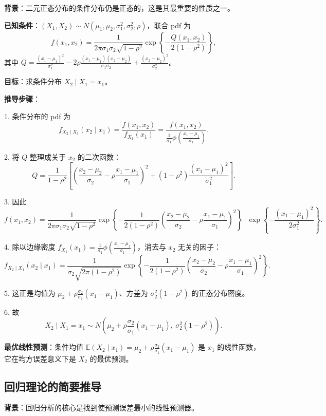 \textbf{背景}：二元正态分布的条件分布仍是正态的，这是其最重要的性质之一。

\textbf{已知条件}：$(X_1, X_2) \sim N(\mu_1, \mu_2, \sigma_1^2, \sigma_2^2, \rho)$，联合 pdf 为
\[
f(x_1, x_2) = \frac{1}{2\pi\sigma_1\sigma_2\sqrt{1-\rho^2}} \exp\left\{ -\frac{Q(x_1,x_2)}{2(1-\rho^2)} \right\},
\]
其中 $Q = \frac{(x_1-\mu_1)^2}{\sigma_1^2} - 2\rho\frac{(x_1-\mu_1)(x_2-\mu_2)}{\sigma_1\sigma_2} + \frac{(x_2-\mu_2)^2}{\sigma_2^2}$。

\textbf{目标}：求条件分布 $X_2 \mid X_1 = x_1$。

\textbf{推导步骤}：

1. 条件分布的 pdf 为
\[
f_{X_2 \mid X_1}(x_2 \mid x_1) = \frac{f(x_1, x_2)}{f_{X_1}(x_1)} = \frac{f(x_1, x_2)}{\frac{1}{\sigma_1}\phi\!\left(\frac{x_1-\mu_1}{\sigma_1}\right)}.
\]

2. 将 $Q$ 整理成关于 $x_2$ 的二次函数：
\[
Q = \frac{1}{1-\rho^2}\left[ \left(\frac{x_2-\mu_2}{\sigma_2} - \rho\frac{x_1-\mu_1}{\sigma_1}\right)^2 + (1-\rho^2)\frac{(x_1-\mu_1)^2}{\sigma_1^2} \right].
\]

3. 因此
\[
f(x_1, x_2) = \frac{1}{2\pi\sigma_1\sigma_2\sqrt{1-\rho^2}} \exp\left\{ -\frac{1}{2(1-\rho^2)}\left(\frac{x_2-\mu_2}{\sigma_2} - \rho\frac{x_1-\mu_1}{\sigma_1}\right)^2 \right\} \cdot \exp\left\{ -\frac{(x_1-\mu_1)^2}{2\sigma_1^2} \right\}.
\]

4. 除以边缘密度 $f_{X_1}(x_1) = \frac{1}{\sigma_1}\phi\!\left(\frac{x_1-\mu_1}{\sigma_1}\right)$，消去与 $x_2$ 无关的因子：
\[
f_{X_2 \mid X_1}(x_2 \mid x_1) = \frac{1}{\sigma_2\sqrt{2\pi(1-\rho^2)}} \exp\left\{ -\frac{1}{2(1-\rho^2)}\left(\frac{x_2-\mu_2}{\sigma_2} - \rho\frac{x_1-\mu_1}{\sigma_1}\right)^2 \right\}.
\]

5. 这正是均值为 $\mu_2 + \rho\frac{\sigma_2}{\sigma_1}(x_1 - \mu_1)$、方差为 $\sigma_2^2(1-\rho^2)$ 的正态分布密度。

6. 故
\[
X_2 \mid X_1 = x_1 \sim N\!\left(\mu_2 + \rho\frac{\sigma_2}{\sigma_1}(x_1 - \mu_1),\ \sigma_2^2(1-\rho^2)\right).
\]

\textbf{最优线性预测}：条件均值 $\mathbb{E}(X_2 \mid x_1) = \mu_2 + \rho\frac{\sigma_2}{\sigma_1}(x_1 - \mu_1)$ 是 $x_1$ 的线性函数，它在均方误差意义下是 $X_2$ 的最优预测。

\subsection{回归理论的简要推导}\label{sec:derivation-ch2-regression}

\textbf{背景}：回归分析的核心是找到使预测误差最小的线性预测器。

